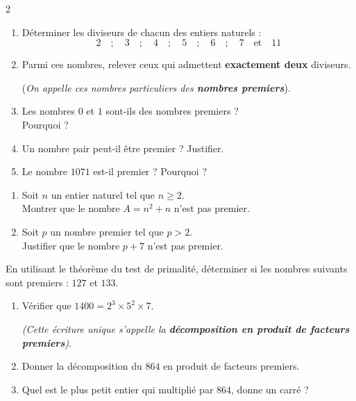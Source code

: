 \documentclass[10pt, a4paper]{article}
\begin{document}
\begin{multicols*}{2}
\begin{Activite}[][10 min]
\begin{enumerate}[leftmargin=*,itemsep=0.5pt]
    \item Déterminer les diviseurs de chacun des entiers naturels :
    $$2 \quad ; \quad 3 \quad ; \quad 4 \quad ; \quad 5 \quad ; \quad 6 \quad ; \quad 7 \quad \text{et} \quad 11$$

    \item Parmi ces nombres, relever ceux qui admettent \textbf{exactement deux} diviseurs.

    (\textit{On appelle ces nombres particuliers des \textbf{nombres premiers}}).

    \item Les nombres $0$ et $1$ sont-ils des nombres premiers ? \\
    Pourquoi ?

    \item Un nombre pair peut-il être premier ? Justifier.

    \item Le nombre $1071$ est-il premier ? Pourquoi ?
\end{enumerate}
\end{Activite}

\begin{Application}[][15 min]
\begin{enumerate}[leftmargin=*,itemsep=0.5pt]
    \item Soit $n$ un entier naturel tel que $n \ge 2$.\\
          Montrer que le nombre $A = n^2 + n$ n'est pas premier.

    \item Soit $p$ un nombre premier tel que $p > 2$. \\
    Justifier que le nombre $p + 7$ n'est pas premier.
\end{enumerate}
\end{Application}

\begin{Application}[][15 min]
  En utilisant le théorème du test de primalité, déterminer si les nombres suivants sont premiers : $127$ et $133$.
\end{Application}

\end{multicols*}

\begin{Activite}[][10 min]
\begin{enumerate}[leftmargin=*,itemsep=0.5pt]
   \item Vérifier que $1400 = 2^3 \times 5^2 \times 7 $.

   \textit{(Cette écriture unique s'appelle la \textbf{décomposition en produit de facteurs premiers})}.
    \item Donner la décomposition du $864$ en produit de facteurs premiers.
    \item Quel est le plus petit entier qui multiplié par $864$, donne un carré ?
\end{enumerate}
\end{Activite}
\end{document}

